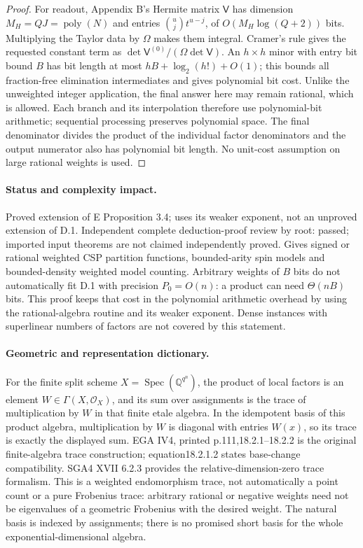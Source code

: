 \begin{proof}
For readout, Appendix B's Hermite matrix $\mathsf V$ has dimension $M_H=QJ=\operatorname{poly}(N)$ and entries $\binom uj t^{u-j}$, of $O(M_H\log(Q+2))$ bits. Multiplying the Taylor data by $\Omega$ makes them integral. Cramer's rule gives the requested constant term as $\det\mathsf V^{(0)}/(\Omega\det\mathsf V)$. An $h\times h$ minor with entry bit bound $B$ has bit length at most $hB+\log_2(h!)+O(1)$; this bounds all fraction-free elimination intermediates and gives polynomial bit cost. Unlike the unweighted integer application, the final answer here may remain rational, which is allowed. Each branch and its interpolation therefore use polynomial-bit arithmetic; sequential processing preserves polynomial space. The final denominator divides the product of the individual factor denominators and the output numerator also has polynomial bit length. No unit-cost assumption on large rational weights is used.
\end{proof}
\paragraph{Status and complexity impact.}
Proved extension of E Proposition 3.4; uses its weaker exponent, not an unproved extension of D.1. Independent complete deduction-proof review by root: passed; imported input theorems are not claimed independently proved. Gives signed or rational weighted CSP partition functions, bounded-arity spin models and bounded-density weighted model counting. Arbitrary weights of $B$ bits do not automatically fit D.1 with precision $P_0=O(n)$: a product can need $\Theta(nB)$ bits. This proof keeps that cost in the polynomial arithmetic overhead by using the rational-algebra routine and its weaker exponent. Dense instances with superlinear numbers of factors are not covered by this statement.

\paragraph{Geometric and representation dictionary.}
For the finite split scheme $X=\operatorname{Spec}(\mathbb Q^{q^n})$, the product of local factors is an element $W\in\Gamma(X,\mathcal O_X)$, and its sum over assignments is the trace of multiplication by $W$ in that finite etale algebra. In the idempotent basis of this product algebra, multiplication by $W$ is diagonal with entries $W(x)$, so its trace is exactly the displayed sum. EGA IV4, printed p.111,18.2.1--18.2.2 is the original finite-algebra trace construction; equation18.2.1.2 states base-change compatibility. SGA4 XVII 6.2.3 provides the relative-dimension-zero trace formalism. This is a weighted endomorphism trace, not automatically a point count or a pure Frobenius trace: arbitrary rational or negative weights need not be eigenvalues of a geometric Frobenius with the desired weight. The natural basis is indexed by assignments; there is no promised short basis for the whole exponential-dimensional algebra.



